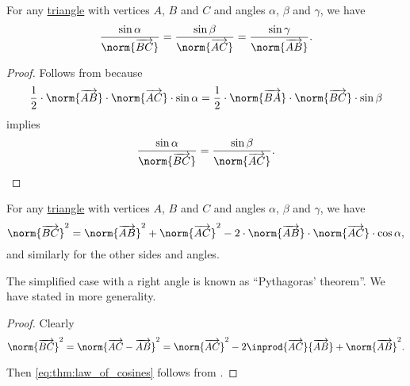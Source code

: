 \begin{theorem}\label{thm:law_of_sines}
  For any \hyperref[def:triangle]{triangle} with vertices \( A \), \( B \) and \( C \) and angles \( \alpha \), \( \beta \) and \( \gamma \), we have
  \begin{equation}\label{eq:thm:law_of_sines}
    \frac {\sin \alpha} {\norm{\vect{BC}}}
    =
    \frac {\sin \beta} {\norm{\vect{AC}}}
    =
    \frac {\sin \gamma} {\norm{\vect{AB}}}.
  \end{equation}
\end{theorem}
\begin{proof}
  Follows from  because
  \begin{equation*}
    \frac 1 2 \cdot \norm{\vect{AB}} \cdot \norm{\vect{AC}} \cdot \sin \alpha
    =
    \frac 1 2 \cdot \norm{\vect{BA}} \cdot \norm{\vect{BC}} \cdot \sin \beta
  \end{equation*}
  implies
  \begin{equation*}
    \frac {\sin \alpha} {\norm{\vect{BC}}}
    =
    \frac {\sin \beta} {\norm{\vect{AC}}}.
  \end{equation*}
\end{proof}

\begin{theorem}\label{thm:law_of_cosines}
  For any \hyperref[def:triangle]{triangle} with vertices \( A \), \( B \) and \( C \) and angles \( \alpha \), \( \beta \) and \( \gamma \), we have
  \begin{equation}\label{eq:thm:law_of_cosines}
    \norm{\vect{BC}}^2 = \norm{\vect{AB}}^2 + \norm{\vect{AC}}^2 - 2 \cdot \norm{\vect{AB}} \cdot \norm{\vect{AC}} \cdot \cos \alpha,
  \end{equation}
  and similarly for the other sides and angles.

  The simplified case with a right angle is known as \enquote{Pythagoras' theorem}. We have stated  in more generality.
\end{theorem}
\begin{proof}
  Clearly
  \begin{equation*}
    \norm{\vect{BC}}^2
    =
    \norm{\vect{AC} - \vect{AB}}^2
    =
    \norm{\vect{AC}}^2 - 2 \inprod{\vect{AC}}{\vect{AB}} + \norm{\vect{AB}}^2.
  \end{equation*}

  Then \eqref{eq:thm:law_of_cosines} follows from .
\end{proof}
